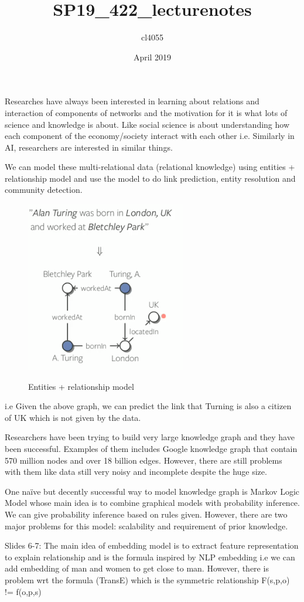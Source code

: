 \documentclass{article}
\title{SP19_422_lecturenotes}
\author{cl4055 }
\date{April 2019}
\begin{document}
Researches have always been interested in learning about relations and interaction of components of networks and the motivation for it is what lots of science and knowledge is about. Like social science is about understanding how each component of the economy/society interact with each other i.e. Similarly in AI, researchers are interested in similar things. 

We can model these multi-relational data (relational knowledge) using entities + relationship model and use the model to do link prediction, entity resolution and community detection. 
\begin{figure}[htb!]
\centering
\includegraphics[width=0.5\linewidth]{slides2.PNG}
\label{fig:tag_overlap}
\caption{Entities + relationship model}
\end{figure}
i.e Given the above graph, we can predict the link that Turning is also a citizen of UK which is not given by the data.

Researchers have been trying to build very large knowledge graph and they have been successful. Examples of them includes Google knowledge graph that contain 570 million nodes and over 18 billion edges. However, there are still problems with them like data still very noisy and incomplete despite the huge size.

One naïve but decently successful way to model knowledge graph is Markov Logic Model whose main idea is to combine graphical models with probability inference. We can give probability inference based on rules given. However, there are two major problems for this model: scalability and requirement of prior knowledge.

Slides 6-7:
The main idea of embedding model is to extract feature representation to explain relationship and is the formula inspired by NLP embedding i.e we can add embedding of man and women to get close to man.
However, there is problem wrt the formula (TransE) which is the symmetric relationship
F(s,p,o) != f(o,p,s)
\end{document}
